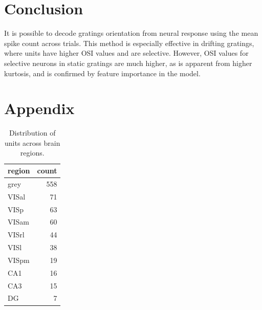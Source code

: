 \documentclass[10pt,twocolumn]{article}
\begin{document}
\section{Conclusion}

It is possible to decode gratings orientation from neural response using the mean spike count across trials. This method is especially effective in drifting gratings, where units have higher OSI values and are selective. However, OSI values for selective neurons in static gratings are much higher, as is apparent from higher kurtosis, and is confirmed by feature importance in the model.

\newpage




\appendix

\section{Appendix}

\begin{table}[H]
  \centering
  \begin{tabular}{lr}
    \toprule
    region & count \\
    \midrule
    grey   & 558 \\
    VISal  &  71 \\
    VISp   &  63 \\
    VISam  &  60 \\
    VISrl  &  44 \\
    VISl   &  38 \\
    VISpm  &  19 \\
    CA1    &  16 \\
    CA3    &  15 \\
    DG     &   7 \\
    \bottomrule
  \end{tabular}
  \caption{Distribution of units across brain regions.}
  \label{tab:regions}
\end{table}
\end{document}

